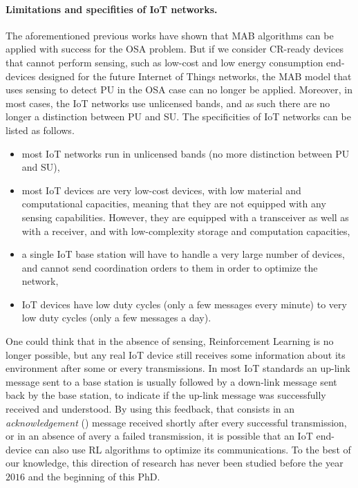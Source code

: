 

\paragraph{Limitations and specifities of IoT networks.}
%
The aforementioned previous works have shown that MAB algorithms can be applied with success for the OSA problem.
But if we consider CR-ready devices that cannot perform sensing, such as low-cost and low energy consumption end-devices designed for the future Internet of Things networks, the MAB model that uses sensing to detect PU in the OSA case can no longer be applied.
Moreover, in most cases, the IoT networks use unlicensed bands, and as such there are no longer a distinction between PU and SU.
%
The specificities of IoT networks can be listed as follows.
\begin{itemize}\tightlist
    \item
    most IoT networks run in unlicensed bands (no more distinction between PU and SU),
    \item
    most IoT devices are very low-cost devices, with low material and computational capacities,
    meaning that they are not equipped with any sensing capabilities.
    However, they are equipped with a transceiver as well as with a receiver,
    and with low-complexity storage and computation capacities,
    \item
    a single IoT base station will have to handle a very large number of devices,
    and cannot send coordination orders to them in order to optimize the network,
    \item
    IoT devices have low duty cycles (only a few messages every minute) to very low duty cycles (only a few messages a day).
\end{itemize}

One could think that in the absence of sensing, Reinforcement Learning is no longer possible, but any real IoT device still receives some information about its environment after some or every transmissions.
In most IoT standards an up-link message sent to a base station is usually followed by a down-link message sent back by the base station, to indicate if the up-link message was successfully received and understood.
%
By using this feedback, that consists in an \emph{acknowledgement} (\Ack) message received shortly after every successful transmission, or in an absence of \Ack{} avery a failed transmission, it is possible that an IoT end-device can also use RL algorithms to optimize its communications.
%
To the best of our knowledge, this direction of research has never been studied before the year $2016$ and the beginning of this PhD.

